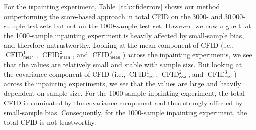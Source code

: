 \documentclass{article}
\theoremstyle{plain}
\theoremstyle{definition}
\theoremstyle{remark}
\newcommand{\tabref}[1]{Table~\ref{tab:#1}}
\DeclareMathOperator{\CFID}{CFID}
\newcommand{\mean}{_{\mathsf{mean}}}
\newcommand{\cova}{_{\mathsf{cov}}}
\begin{document}
For the inpainting experiment, \tabref{cfiderrors} shows our method outperforming the score-based approach in total CFID on the 3000- and 30\,000-sample test sets but not on the 1000-sample test set.
However, we now argue that the 1000-sample inpainting experiment is heavily affected by small-sample bias, and therefore untrustworthy.
Looking at the mean component of CFID (i.e., $\CFID\mean^1$, $\CFID\mean^2$, and $\CFID\mean^3$) across the inpainting experiments, we see that the values are relatively small and stable with sample size.
But looking at the covariance component of CFID (i.e., $\CFID\cova^1$, $\CFID\cova^2$, and $\CFID\cova^3$) across the inpainting experiments, we see that the values are large and heavily dependent on sample size.
For the 1000-sample inpainting experiment, the total CFID is dominated by the covariance component and thus strongly affected by small-sample bias.
Consequently, for the 1000-sample inpainting experiment, the total CFID is not trustworthy.



\clearpage
\end{document}
